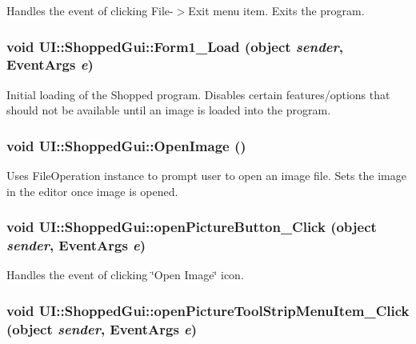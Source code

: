 \label{class_u_i_1_1_shopped_gui_a4c3239cc225d230bafb0cc53a9f49e2c}
Handles the event of clicking File-\/$>$Exit menu item. Exits the program. \hypertarget{class_u_i_1_1_shopped_gui_ad9bcb5a3a89de53a6ef580bd806fae26}{
\subsubsection[{Form1\_\-Load}]{\setlength{\rightskip}{0pt plus 5cm}void UI::ShoppedGui::Form1\_\-Load (object {\em sender}, \/  EventArgs {\em e})}}
\label{class_u_i_1_1_shopped_gui_ad9bcb5a3a89de53a6ef580bd806fae26}
Initial loading of the Shopped program. Disables certain features/options that should not be available until an image is loaded into the program. \hypertarget{class_u_i_1_1_shopped_gui_a3a27f074b7b204b1df148921a0dcc20c}{
\subsubsection[{OpenImage}]{\setlength{\rightskip}{0pt plus 5cm}void UI::ShoppedGui::OpenImage ()}}
\label{class_u_i_1_1_shopped_gui_a3a27f074b7b204b1df148921a0dcc20c}
Uses FileOperation instance to prompt user to open an image file. Sets the image in the editor once image is opened. \hypertarget{class_u_i_1_1_shopped_gui_a5a4be38d87e3d968e9336400e572b646}{
\subsubsection[{openPictureButton\_\-Click}]{\setlength{\rightskip}{0pt plus 5cm}void UI::ShoppedGui::openPictureButton\_\-Click (object {\em sender}, \/  EventArgs {\em e})}}
\label{class_u_i_1_1_shopped_gui_a5a4be38d87e3d968e9336400e572b646}
Handles the event of clicking \char`\"{}Open Image\char`\"{} icon. \hypertarget{class_u_i_1_1_shopped_gui_a059988dec5a74fcc82ee2eb503d49118}{
\subsubsection[{openPictureToolStripMenuItem\_\-Click}]{\setlength{\rightskip}{0pt plus 5cm}void UI::ShoppedGui::openPictureToolStripMenuItem\_\-Click (object {\em sender}, \/  EventArgs {\em e})}}
